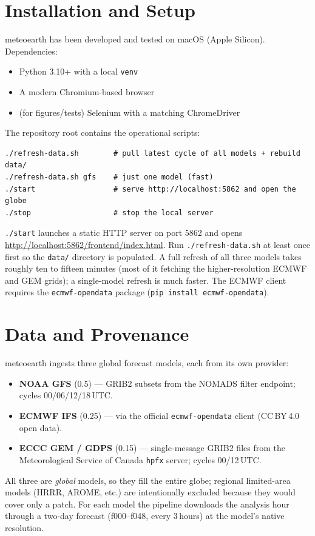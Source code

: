\documentclass[11pt,letterpaper]{article}
\begin{document}
\section{Installation and Setup}

meteoearth has been developed and tested on macOS (Apple Silicon). Dependencies:
\begin{itemize}
  \item Python 3.10+ with a local \texttt{venv}
  \item A modern Chromium-based browser
  \item (for figures/tests) Selenium with a matching ChromeDriver
\end{itemize}

The repository root contains the operational scripts:
\begin{lstlisting}
./refresh-data.sh        # pull latest cycle of all models + rebuild data/
./refresh-data.sh gfs    # just one model (fast)
./start                  # serve http://localhost:5862 and open the globe
./stop                   # stop the local server
\end{lstlisting}

\texttt{./start} launches a static HTTP server on port 5862 and opens
\url{http://localhost:5862/frontend/index.html}. Run \texttt{./refresh-data.sh}
at least once first so the \texttt{data/} directory is populated. A full refresh
of all three models takes roughly ten to fifteen minutes (most of it fetching
the higher-resolution ECMWF and GEM grids); a single-model refresh is much
faster. The ECMWF client requires the \texttt{ecmwf-opendata} package
(\texttt{pip install ecmwf-opendata}).

\section{Data and Provenance}
\label{sec:data}

meteoearth ingests three global forecast models, each from its own provider:
\begin{itemize}
  \item \textbf{NOAA GFS} (0.5\textdegree{}) --- GRIB2 subsets from the NOMADS
        filter endpoint; cycles 00/06/12/18\,UTC.
  \item \textbf{ECMWF IFS} (0.25\textdegree{}) --- via the official
        \texttt{ecmwf-opendata} client (CC\,BY\,4.0 open data).
  \item \textbf{ECCC GEM / GDPS} (0.15\textdegree{}) --- single-message GRIB2
        files from the Meteorological Service of Canada \texttt{hpfx} server;
        cycles 00/12\,UTC.
\end{itemize}
All three are \emph{global} models, so they fill the entire globe; regional
limited-area models (HRRR, AROME, etc.) are intentionally excluded because they
would cover only a patch. For each model the pipeline downloads the analysis
hour through a two-day forecast (f000--f048, every 3\,hours) at the model's
native resolution.
\end{document}
